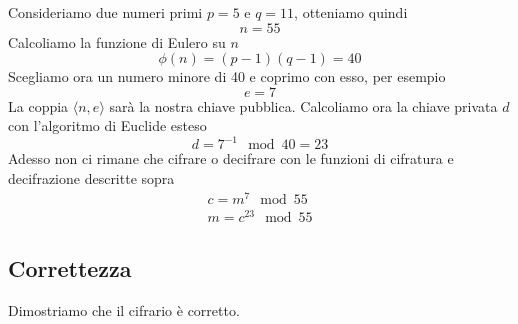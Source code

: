\begin{example}
	Consideriamo due numeri primi $p = 5$ e $q = 11$, otteniamo quindi
	\[ n = 55 \]
	Calcoliamo la funzione di Eulero su $n$
	\[ \phi(n) = (p - 1) (q - 1) = 40 \]
	Scegliamo ora un numero minore di 40 e coprimo con esso, per esempio
	\[ e = 7 \]
	La coppia $\langle n, e \rangle$ sar\`a la nostra chiave pubblica. Calcoliamo ora la chiave privata $d$ con
	l'algoritmo di Euclide esteso
	\[ d = 7^{-1} \mod{40} = 23 \]
	Adesso non ci rimane che cifrare o decifrare con le funzioni di cifratura e decifrazione descritte sopra
	\[
		\begin{matrix}
			c = m^7 \mod{55} \\
			m = c^{23} \mod{55}
		\end{matrix}
	\]
\end{example}

\subsection{Correttezza}
Dimostriamo che il cifrario \`e corretto.

